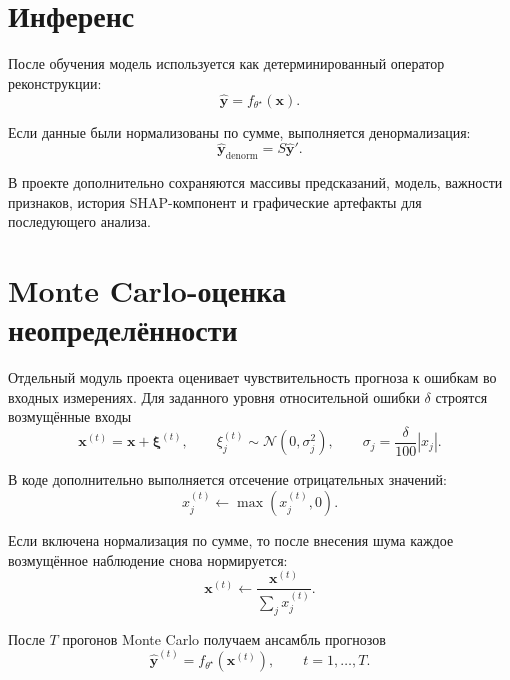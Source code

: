 \documentclass[11pt]{article}
\begin{document}
\section{Инференс}

После обучения модель используется как детерминированный оператор реконструкции:
\begin{equation}
\hat{\mathbf{y}} = f_{\theta^{\star}}(\mathbf{x}).
\end{equation}

Если данные были нормализованы по сумме, выполняется денормализация:
\begin{equation}
\hat{\mathbf{y}}_{\mathrm{denorm}} = S \hat{\mathbf{y}}'.
\end{equation}

В проекте дополнительно сохраняются массивы предсказаний, модель, важности признаков, история SHAP-компонент и графические артефакты для последующего анализа.

\section{Monte Carlo-оценка неопределённости}

Отдельный модуль проекта оценивает чувствительность прогноза к ошибкам во входных измерениях. Для заданного уровня относительной ошибки $\delta$ строятся возмущённые входы
\begin{equation}
\mathbf{x}^{(t)} = \mathbf{x} + \boldsymbol{\xi}^{(t)},
\qquad
\xi_j^{(t)} \sim \mathcal{N}\!\left(0, \sigma_j^2\right),
\qquad
\sigma_j = \frac{\delta}{100}|x_j|.
\end{equation}

В коде дополнительно выполняется отсечение отрицательных значений:
\begin{equation}
 x_j^{(t)} \leftarrow \max(x_j^{(t)}, 0).
\end{equation}

Если включена нормализация по сумме, то после внесения шума каждое возмущённое наблюдение снова нормируется:
\begin{equation}
\mathbf{x}^{(t)} \leftarrow \frac{\mathbf{x}^{(t)}}{\sum_j x_j^{(t)}}.
\end{equation}

После $T$ прогонов Monte Carlo получаем ансамбль прогнозов
\begin{equation}
\hat{\mathbf{y}}^{(t)} = f_{\theta^{\star}}(\mathbf{x}^{(t)}),
\qquad
t=1,\dots,T.
\end{equation}
\end{document}
